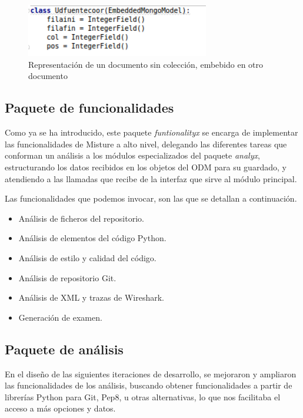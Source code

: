 \begin{figure}[H]
   \centering
   \includegraphics[width=8cm]{img/Selection_027_mongoembdoc}
   \caption{Representación de un documento sin colección, embebido en otro documento}
   \label{figura:mon_emb}
\end{figure}


\subsection{Paquete de funcionalidades} 
\label{subsec:paq_functs}

Como ya se ha introducido, este paquete \textit{funtionalityx} se encarga de implementar las funcionalidades de Misture a alto nivel, delegando las diferentes tareas que conforman un análisis a los módulos especializados del paquete \textit{analyx}, estructurando los datos recibidos en los objetos del ODM para su guardado, y atendiendo a las llamadas que recibe de la interfaz que sirve al módulo principal.


Las funcionalidades que podemos invocar, son las que se detallan a continuación.

\begin{itemize}
\item Análisis de ficheros del repositorio.

\item Análisis de elementos del código Python.

\item Análisis de estilo y calidad del código.

\item Análisis de repositorio Git.

\item Análisis de XML y trazas de Wireshark.

\item Generación de examen.
\end{itemize}


\subsection{Paquete de análisis} 
\label{subsec:paq_anals}


En el diseño de las siguientes iteraciones de desarrollo, se mejoraron y ampliaron las funcionalidades de los análisis, buscando obtener funcionalidades a partir de librerías Python para Git, Pep8, u otras alternativas, lo que nos facilitaba el acceso a más opciones y datos.


